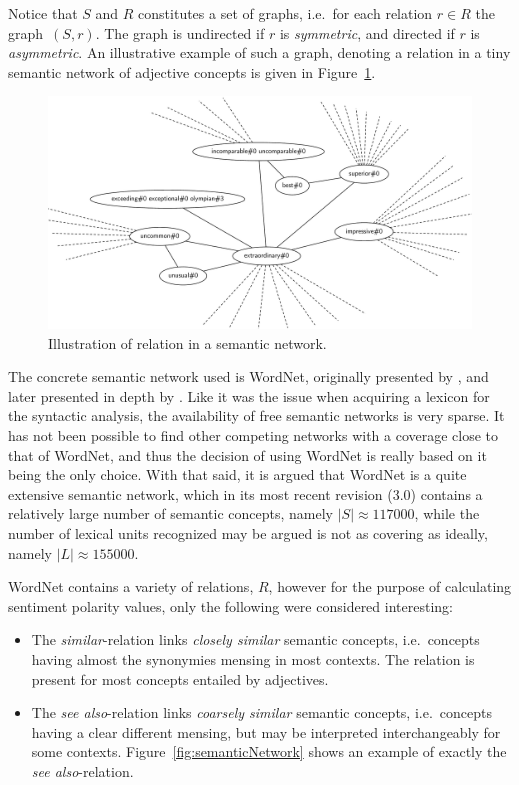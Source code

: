 Notice that $S$ and $R$ constitutes a set of graphs, i.e.\ for each relation $r \in R$ the graph~$(S,r)$. The graph is undirected if $r$ is \emph{symmetric}, and directed if $r$ is \emph{asymmetric}. An illustrative example of such a graph, denoting a relation in a tiny semantic network of adjective concepts is given in Figure~\ref{fig:semanticNetwork}.

\begin{figure}[ht]
  \center
  \includegraphics[scale=.3]{Figures/Exceptional}
  \caption{Illustration of relation in a semantic network.}
  \label{fig:semanticNetwork}
\end{figure}

The concrete semantic network used is WordNet, originally presented by \citeauthor{wordnet} , and later presented in depth by \citeauthor{wordnetBook} . Like it was the issue when acquiring a lexicon for the syntactic analysis, the availability of free semantic networks is very sparse. It has not been possible to find other competing networks with a coverage close to that of WordNet, and thus the decision of using WordNet is really based on it being the only choice. With that said, it is argued that WordNet is a quite extensive semantic network, which in its most recent revision (3.0) contains a relatively large number of semantic concepts, namely $|S| \approx \num{117000}$, while the number of lexical units recognized may be argued is not as covering as ideally, namely $|L| \approx \num{155000}$.

WordNet contains a variety of relations, $R$, however for the purpose of calculating sentiment polarity values, only the following were considered interesting:
\begin{itemize}
	\item The \emph{similar}-relation links \emph{closely similar} semantic concepts, i.e.\ concepts having almost the synonymies mensing in most contexts. The relation is present for most concepts entailed by adjectives.
	\item The \emph{see also}-relation links \emph{coarsely similar} semantic concepts, i.e.\ concepts having a clear different mensing, but may be interpreted interchangeably for some contexts. Figure~\vref{fig:semanticNetwork} shows an example of exactly the \emph{see also}-relation.
\end{itemize}



